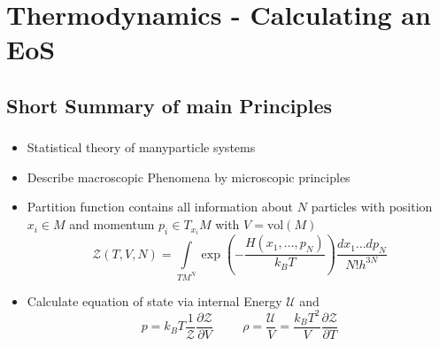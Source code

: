 \section{Thermodynamics - Calculating an EoS}

\subsection{Short Summary of main Principles}
\begin{frame}
	\frametitle{\insertsubsection}
	\begin{itemize}%
		\item Statistical theory of manyparticle systems
		\item Describe macroscopic Phenomena by microscopic principles
		\item Partition function contains all information about $N$ particles with position $x_i\in M$ and momentum $p_i\in T_{x_i}M$ with $V=\text{vol}(M)$
		\begin{equation}
			\mathcal{Z}(T,V,N) = \int\limits_{TM^N}\exp\left(-\frac{H(x_1,\dots,p_N)}{k_BT}\right)\frac{dx_1\dots dp_N}{N!h^{3N}}
		\end{equation}
		\item Calculate equation of state via internal Energy $\mathcal{U}$ and
		\begin{equation}
			p = k_BT\frac{1}{\mathcal{Z}}\frac{\partial\mathcal{Z}}{\partial V} \hspace{1cm} \rho = \frac{\mathcal{U}}{V} = \frac{k_BT^2}{V}\frac{\partial\mathcal{Z}}{\partial T}
			\label{1-Thermo-Pres-Dens}
		\end{equation}
	\end{itemize}
\end{frame}


